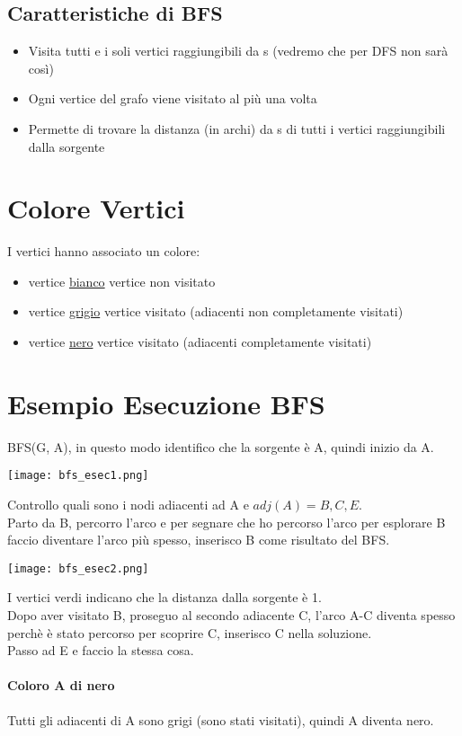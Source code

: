 \subsection{Caratteristiche di BFS}
\begin{itemize}
    \item Visita tutti e i soli vertici raggiungibili da s (vedremo che per DFS non sarà così)
    \item Ogni vertice del grafo viene visitato al più una volta
    \item Permette di trovare la distanza (in archi) da s di tutti i vertici
    raggiungibili dalla sorgente
\end{itemize}
\section{Colore Vertici}
I vertici hanno associato un colore:
\begin{itemize}
    \item vertice \underline{bianco} \ra vertice non visitato
    \item vertice \underline{grigio} \ra vertice visitato (adiacenti non
    completamente visitati)
    \item vertice \underline{nero} \ra vertice visitato (adiacenti completamente visitati)
\end{itemize}
\section{Esempio Esecuzione BFS}
BFS(G, A), in questo modo identifico che la sorgente è A, quindi inizio da A.
\begin{center}
    \texttt{[image: bfs\_esec1.png]}
\end{center}
Controllo quali sono i nodi adiacenti ad A e $adj(A)=B,C,E$.\\
Parto da B, percorro l'arco e per segnare che ho percorso l'arco per esplorare B 
faccio diventare l'arco più spesso, inserisco B come risultato del BFS.
\begin{center}
    \texttt{[image: bfs\_esec2.png]}
\end{center}
I vertici verdi indicano che la distanza dalla sorgente è 1.\\
Dopo aver visitato B, proseguo al secondo adiacente C, l'arco A-C diventa spesso 
perchè è stato percorso per scoprire C, inserisco C nella soluzione.\\
Passo ad E e faccio la stessa cosa.
\paragraph*{Coloro A di nero} Tutti gli adiacenti di A sono grigi (sono stati visitati), quindi
A diventa nero.

